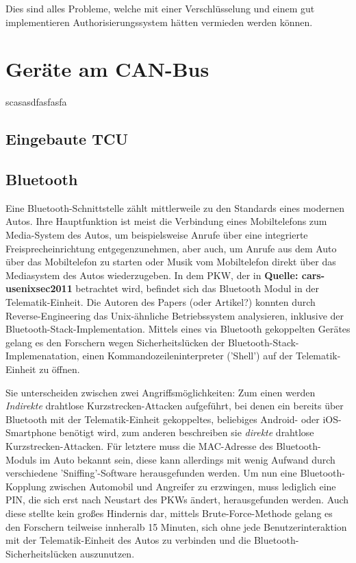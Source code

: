 \documentclass[
    fontsize=12pt,
    headings=small,
    parskip=half,           %
    bibliography=totoc,9
    numbers=noenddot,       %
    open=any,               %
    ]{scrreprt}
\begin{document}
Dies sind alles Probleme, welche mit einer Verschlüsselung und einem gut implementieren Authorisierungssystem hätten vermieden werden können.


\section{Geräte am CAN-Bus}
scasasdfasfasfa
\subsection{Eingebaute TCU}

\subsection{Bluetooth}
Eine Bluetooth-Schnittstelle zählt mittlerweile zu den Standards eines modernen Autos. Ihre Hauptfunktion ist meist die Verbindung eines Mobiltelefons zum Media-System des Autos, um beispielsweise Anrufe über eine integrierte Freisprecheinrichtung entgegenzunehmen, aber auch, um Anrufe aus dem Auto über das Mobiltelefon zu starten oder Musik vom Mobiltelefon direkt über das Mediasystem des Autos wiederzugeben.
In dem PKW, der in \textbf{Quelle: cars-usenixsec2011} betrachtet wird, befindet sich das Bluetooth Modul in der Telematik-Einheit. Die Autoren des Papers (oder Artikel?) konnten durch Reverse-Engineering das Unix-ähnliche Betriebssystem analysieren, inklusive der Bluetooth-Stack-Implementation. Mittels eines via Bluetooth gekoppelten Gerätes gelang es den Forschern wegen Sicherheitslücken der Bluetooth-Stack-Implemenatation, einen Kommandozeileninterpreter ('Shell') auf der Telematik-Einheit zu öffnen. \par
Sie unterscheiden zwischen zwei Angriffsmöglichkeiten: Zum einen werden \textit{Indirekte} drahtlose Kurzstrecken-Attacken aufgeführt, bei denen ein bereits über Bluetooth mit der Telematik-Einheit gekoppeltes, beliebiges Android- oder iOS-Smartphone benötigt wird, zum anderen beschreiben sie \textit{direkte} drahtlose Kurzstrecken-Attacken. Für letztere muss die MAC-Adresse des Bluetooth-Moduls im Auto bekannt sein, diese kann allerdings mit wenig Aufwand durch verschiedene 'Sniffing'-Software herausgefunden werden. Um nun eine Bluetooth-Kopplung zwischen Automobil und Angreifer zu erzwingen, muss lediglich eine PIN, die sich erst nach Neustart des PKWs ändert, herausgefunden werden. Auch diese stellte kein großes Hindernis dar, mittels Brute-Force-Methode gelang es den Forschern teilweise innheralb 15 Minuten, sich ohne jede Benutzerinteraktion mit der Telematik-Einheit des Autos zu verbinden und die Bluetooth-Sicherheitslücken auszunutzen.\par
\end{document}
